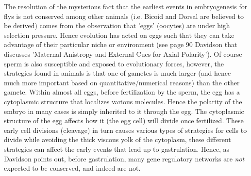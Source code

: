   The resolution of the mysterious fact that the earliest events in embryogenesis for flys is not conserved among other animals (i.e. Bicoid and Dorsal are believed to be derived) comes from the observation that 'eggs' (oocytes) are under high selection pressure.  Hence evolution has acted on eggs such that they can take advantage of their particular niche or environment (see page 90 Davidson that discusses 'Maternal Anistropy and External Cues for Axial Polarity'\cite{Davidson2006}).  Of course sperm is also susceptible and exposed to evolutionary forces, however, the strategies found in animals is that one of gametes is much larger (and hence much more important based on quantitative/numerical reasons) than the other gamete.  Within almost all eggs, before fertilization by the sperm, the egg has a cytoplasmic structure that localizes various molecules.  Hence the polarity of the embryo in many cases is simply inherited to it through the egg.  The cytoplasmic structure of the egg affects how it (the egg cell) will divide once fertilized.  These early cell divisions (cleavage) in turn causes various types of strategies for cells to divide while avoiding the thick viscous yolk of the cytoplasm, these different strategies can affect the early events that lead up to gastrulation.  Hence, as Davidson points out, before gastrulation, many gene regulatory networks are \textit{not} expected to be conserved, and indeed are not.  
  
